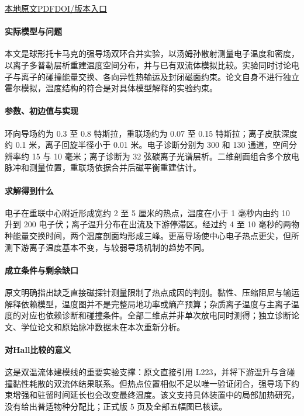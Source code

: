 \href{run:../../papers/Tanabe2015MAST.pdf}{本地原文PDF}\quad\href{https://doi.org/10.1103/PhysRevLett.115.215004}{DOI/版本入口}

\paragraph{实际模型与问题}本文是球形托卡马克的强导场双环合并实验，以汤姆孙散射测量电子温度和密度，以离子多普勒层析重建温度空间分布，并与已有双流体模拟比较。实验同时讨论电子与离子的碰撞能量交换、各向异性热输运及封闭磁面约束。论文自身不进行独立霍尔模拟，温度结构的符合是对具体模型解释的实验约束。

\paragraph{参数、初边值与实现}环向导场约为 0.3 至 0.8 特斯拉，重联场约为 0.07 至 0.15 特斯拉；离子皮肤深度约 0.1 米，离子回旋半径小于 0.01 米。电子诊断分别为 300 和 130 通道，空间分辨率约 15 与 10 毫米；离子诊断为 32 弦碳离子光谱层析。二维剖面组合多个放电脉冲和测量位置，重联场依据合并后磁平衡重建估计。

\paragraph{求解得到什么}电子在重联中心附近形成宽约 2 至 5 厘米的热点，温度在小于 1 毫秒内由约 10 升到 200 电子伏；离子温升分布在出流及下游停滞区。经过约 4 至 10 毫秒的两物种能量交换时间，两个温度剖面均形成三峰。更高导场使中心电子热点更尖，但所测下游离子温度基本不变，与较弱导场机制的趋势不同。

\paragraph{成立条件与剩余缺口}原文明确指出缺乏直接磁探针测量限制了热点成因的判别。黏性、压缩阻尼与输运解释依赖模型，温度图并不是完整局地功率或熵产预算；杂质离子温度与主离子温度的对应也依赖诊断和碰撞条件。全部二维点并非单次放电同时测得；独立诊断论文、学位论文和原始脉冲数据未在本次重新分析。

\paragraph{对Hall比较的意义}这是双温流体建模线的重要实验支撑：原文直接引用 L223，并将下游温升与含碰撞黏性耗散的双流体结果联系。但热点位置相似不足以唯一验证闭合，强导场下约束增强和驻留时间延长也会改变最终温度。该文支持具体装置中的局部加热研究，没有给出普适物种分配比；正式版 5 页及全部五幅图已核读。

